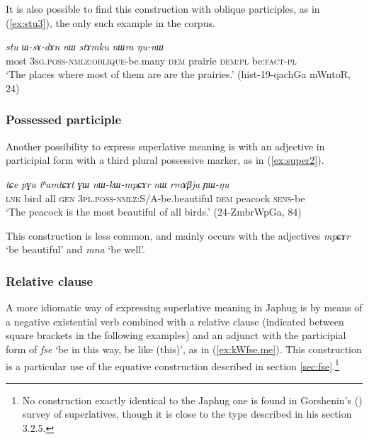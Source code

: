 \documentclass[oneside,a4paper,11pt]{article}
\newcommand{\ipa}[1]{{\phon\textit{#1}}}
\newcommand{\forme}[2]{\ipa{#1} `#2'}
\begin{document}
It is also possible to find this construction with oblique participles, as in (\ref{ex:stu3}), the only such example in the corpus.

\begin{exe}
\ex \label{ex:stu3}
\gll 
\ipa{stu} 	\ipa{ɯ-sɤ-dɤn} 	\ipa{nɯ} 	\ipa{stɤmku} 	\ipa{nɯra} 	\ipa{ŋu-nɯ} \\
most \textsc{3sg.poss-nmlz:oblique}-be.many \textsc{dem} prairie \textsc{dem:pl} be:\textsc{fact-pl} \\
\glt `The places where most of them are are the prairies.' (hist-19-qachGa mWntoR, 24)
\end{exe}

 \subsubsection{Possessed participle}
Another possibility to express superlative meaning is with an adjective in participial form  with a third plural possessive marker, as in (\ref{ex:super2}). 
 
 \begin{exe}
\ex \label{ex:super2}
\gll 
\ipa{tɕe} 	\ipa{pɣa} 	\ipa{tʰamtɕɤt} 	\ipa{ɣɯ} 	\ipa{nɯ-kɯ-mpɕɤr} 	\ipa{nɯ} 	\ipa{rmɤβja} 	\ipa{ɲɯ-ŋu} \\
\textsc{lnk} bird all \textsc{gen} \textsc{3pl.poss-nmlz}:S/A-be.beautiful \textsc{dem} peacock \textsc{sens}-be \\
\glt  `The peacock is the most beautiful of all birds.' (24-ZmbrWpGa, 84)
\end{exe}

This construction is less common, and mainly occurs with the adjectives \forme{mpɕɤr}{be beautiful} and \forme{mna}{be well}.

 \subsubsection{Relative clause} \label{sec:relative.superlative}
 A more idiomatic way of expressing superlative meaning in Japhug is by means of a negative existential verb combined with a relative clause (indicated between square brackets in the following examples) and an adjunct with the participial form of \forme{fse}{be in this way, be like (this)}, as in (\ref{ex:kWfse.me}). This construction is a particular use of the equative construction described in section \ref{sec:fse}.\footnote{No construction exactly identical to the Japhug one is found in Gorshenin's (\citeyear{gorshenin12superlative}) survey of superlatives, though it is close to the type described in his section 3.2.5.}
 
\end{document}
